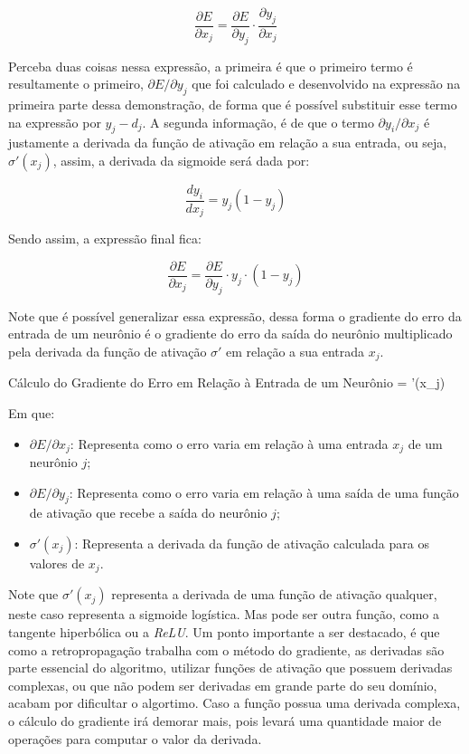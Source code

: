 \[
    \frac{\partial E}{\partial x_j} = \frac{\partial E}{\partial y_j} \cdot \frac{\partial y_j}{\partial x_j}
\]

Perceba duas coisas nessa expressão, a primeira é que o primeiro termo é resultamente o primeiro, $\partial E / \partial y_j$ que foi calculado e desenvolvido na expressão na primeira parte dessa demonstração, de forma que é possível substituir esse termo na expressão por $y_j - d_j$. A segunda informação, é de que o termo $\partial y_i / \partial x_j$ é justamente a derivada da função de ativação em relação a sua entrada, ou seja, $\sigma'(x_j)$, assim, a derivada da sigmoide será dada por:

\[
    \frac{d y_i}{d x_j} = y_j (1 - y_j)
\]

Sendo assim, a expressão final fica:

\begin{equation}
     \frac{\partial E}{\partial x_j} = \frac{\partial E}{\partial y_j} \cdot y_j \cdot (1 - y_j)
     \label{eq:gradiento-do-erro-em-relacao-a-entrada-de-um-neuronio-para-a-mse-e-sigmoide}
\end{equation}

Note que é possível generalizar essa expressão, dessa forma o gradiente do erro da entrada de um neurônio é o gradiente do erro da saída do neurônio multiplicado pela derivada da função de ativação $\sigma'$ em relação a sua entrada $x_j$.

\begin{equacaodestaque}{Cálculo do Gradiente do Erro em Relação à Entrada de um Neurônio}
     =  \cdot \sigma'(x_j)
    \label{eq:gradiente-do-erro-em-relacao-a-entrada-de-um-neuronio}
\end{equacaodestaque}

Em que:

\begin{itemize}
    \item $\partial E / \partial x_j$: Representa como o erro varia em relação à uma entrada $x_j$ de um neurônio $j$;
    \item $\partial E / \partial y_j$: Representa como o erro varia em relação à uma saída de uma função de ativação que recebe a saída do neurônio $j$;
    \item $\sigma'(x_j)$: Representa a derivada da função de ativação calculada para os valores de $x_j$.
\end{itemize}

Note que $\sigma'(x_j)$ representa a derivada de uma função de ativação qualquer, neste caso representa a sigmoide logística. Mas pode ser outra função, como a tangente hiperbólica ou a \textit{ReLU}. Um ponto importante a ser destacado, é que como a retropropagação trabalha com o método do gradiente, as derivadas são parte essencial do algoritmo, utilizar funções de ativação que possuem derivadas complexas, ou que não podem ser derivadas em grande parte do seu domínio, acabam por dificultar o algortimo. Caso a função possua uma derivada complexa, o cálculo do gradiente irá demorar mais, pois levará uma quantidade maior de operações para computar o valor da derivada.

